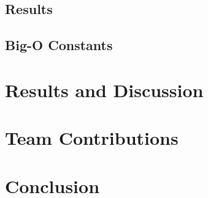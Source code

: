 \documentclass[titlepage]{article}
\begin{document}
\begin{multicols}{2}
			\subsection{Results}
			\subsection{Big-O Constants}
		\section{Results and Discussion}
		\section{Team Contributions}
		\section{Conclusion}
	\end{multicols}
\end{document}
